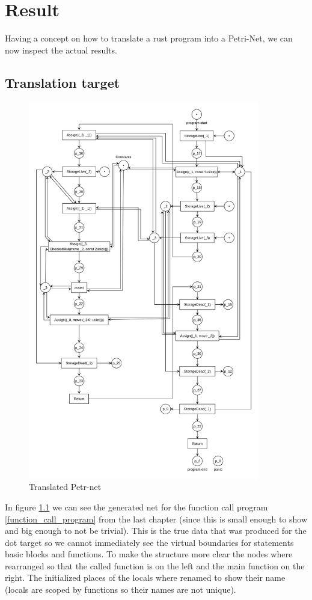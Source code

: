 \chapter{Result}
\label{results}
Having a concept on how to translate a rust program into a Petri-Net, we can now inspect the actual results.
\section{Translation target}
\begin{figure}
  \centering
  \includegraphics[width=0.9\textwidth]{../diagrams/FunctionCallNet.png}
  \caption{Translated Petr-net}
  \label{function_call_net}
\end{figure}
In figure \ref{function_call_net} we can see the generated net for the function call program \ref{function_call_program} from the last chapter (since this is small enough to show and big enough to not be trivial).
This is the true data that was produced for the dot target so we cannot immediately see the virtual boundaries for statements basic blocks and functions.
To make the structure more clear the nodes where rearranged so that the called function is on the left and the main function on the right.
The initialized places of the locals where renamed to show their name (locals are scoped by functions so their names are not unique).

